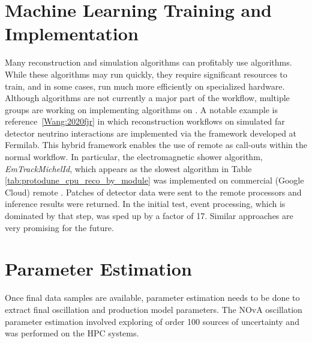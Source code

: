 \documentclass[../main-v1.tex]{subfiles}
\begin{document}
\section{Machine Learning Training and Implementation} 
Many reconstruction and simulation algorithms can profitably use  algorithms.  While these algorithms may run quickly, they   require significant resources to train, and in some cases, run much more efficiently on specialized hardware.  Although  algorithms are not currently a major part of the  workflow, multiple groups are working on implementing  algorithms on .  A notable example is reference~\ref{Wang:2020fjr} in which  reconstruction workflows on simulated far detector neutrino interactions are implemented via the  framework developed at Fermilab. This hybrid framework enables the use of remote  as call-outs within the normal workflow.  In particular, the electromagnetic shower algorithm, {\it EmTrackMichelId}, which appears as the slowest algorithm in Table \ref{tab:protodune_cpu_reco_by_module} was implemented on commercial (Google Cloud) remote . Patches of detector data were sent to the remote processors and inference results were returned.  In the initial test, event processing, which is dominated by that step, was sped up by a factor of 17. Similar approaches are very promising for the future.  


\section{Parameter Estimation}
Once final data samples are available, parameter estimation needs to be done to extract final oscillation and production  model parameters.  The NOvA oscillation parameter estimation \cite{NOvA:2021nfi} involved exploring of order 100 sources of uncertainty and was performed on the  HPC systems.  
\end{document}
